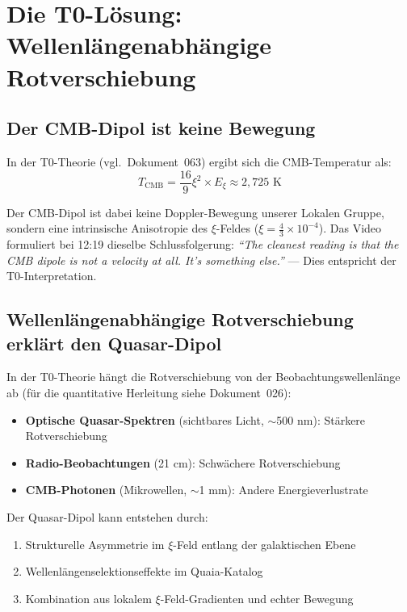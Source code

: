 \section{Die T0-Lösung: Wellenlängenabhängige Rotverschiebung}

	\subsection{Der CMB-Dipol ist keine Bewegung}

	In der T0-Theorie (vgl.\ Dokument~063) ergibt sich die CMB-Temperatur als:
	$$T_{\text{CMB}} = \frac{16}{9} \xi^2 \times E_\xi \approx 2{,}725 \text{ K}$$

	Der CMB-Dipol ist dabei keine Doppler-Bewegung unserer Lokalen Gruppe, sondern eine intrinsische Anisotropie des $\xi$-Feldes ($\xi = \frac{4}{3} \times 10^{-4}$). Das Video formuliert bei 12:19 dieselbe Schlussfolgerung: \textit{``The cleanest reading is that the CMB dipole is not a velocity at all. It's something else.''} --- Dies entspricht der T0-Interpretation.

	\subsection{Wellenlängenabhängige Rotverschiebung erklärt den Quasar-Dipol}

	In der T0-Theorie hängt die Rotverschiebung von der Beobachtungswellenlänge ab (für die quantitative Herleitung siehe Dokument~026):
	\begin{itemize}
		\item \textbf{Optische Quasar-Spektren} (sichtbares Licht, $\sim$500 nm): Stärkere Rotverschiebung
		\item \textbf{Radio-Beobachtungen} (21 cm): Schwächere Rotverschiebung
		\item \textbf{CMB-Photonen} (Mikrowellen, $\sim$1 mm): Andere Energieverlustrate
	\end{itemize}

	Der Quasar-Dipol kann entstehen durch:
	\begin{enumerate}
		\item Strukturelle Asymmetrie im $\xi$-Feld entlang der galaktischen Ebene
		\item Wellenlängenselektionseffekte im Quaia-Katalog \cite{storey2024}
		\item Kombination aus lokalem $\xi$-Feld-Gradienten und echter Bewegung
	\end{enumerate}

